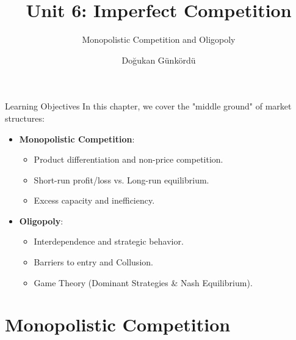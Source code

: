 \documentclass[aspectratio=169]{beamer}
\title{Unit 6: Imperfect Competition}
\subtitle{Monopolistic Competition and Oligopoly}
\author{Doğukan Günkördü}
\date{}
\begin{document}
\begin{frame}
    \titlepage
\end{frame}

\begin{frame}{Learning Objectives}
    In this chapter, we cover the "middle ground" of market structures:
    \begin{itemize}
        \item \textbf{Monopolistic Competition}:
            \begin{itemize}
                \item Product differentiation and non-price competition.
                \item Short-run profit/loss vs. Long-run equilibrium.
                \item Excess capacity and inefficiency.
            \end{itemize}
        \item \textbf{Oligopoly}:
            \begin{itemize}
                \item Interdependence and strategic behavior.
                \item Barriers to entry and Collusion.
                \item Game Theory (Dominant Strategies \& Nash Equilibrium).
            \end{itemize}
    \end{itemize}
\end{frame}

\section{Monopolistic Competition}
\end{document}
